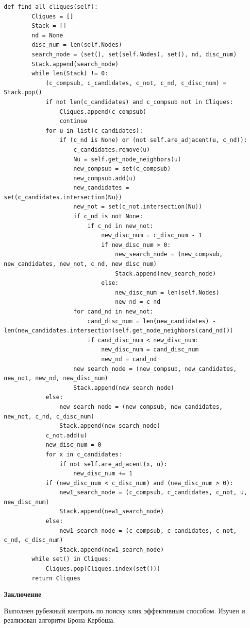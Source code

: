 \documentclass[a4paper,12pt]{report}
\begin{document}
	        \begin{lstlisting}[frame = single, breaklines, caption = Листинг метода поиска всех существующих клик в графе]
	def find_all_cliques(self):
	    Cliques = []
	    Stack = []
	    nd = None
	    disc_num = len(self.Nodes)
	    search_node = (set(), set(self.Nodes), set(), nd, disc_num)
	    Stack.append(search_node)
	    while len(Stack) != 0:
	    	(c_compsub, c_candidates, c_not, c_nd, c_disc_num) = Stack.pop()
	        if not len(c_candidates) and c_compsub not in Cliques:
	        	Cliques.append(c_compsub)
	        	continue
	        for u in list(c_candidates):
	        	if (c_nd is None) or (not self.are_adjacent(u, c_nd)):
	        		c_candidates.remove(u)
	        		Nu = self.get_node_neighbors(u)
	        		new_compsub = set(c_compsub)
	        		new_compsub.add(u)
	        		new_candidates = set(c_candidates.intersection(Nu))
	        		new_not = set(c_not.intersection(Nu))
	        		if c_nd is not None:
	        			if c_nd in new_not:
	        				new_disc_num = c_disc_num - 1
	        				if new_disc_num > 0:
	        					new_search_node = (new_compsub, new_candidates, new_not, c_nd, new_disc_num)
	        					Stack.append(new_search_node)
	        				else:
	        					new_disc_num = len(self.Nodes)
	        					new_nd = c_nd
	        		for cand_nd in new_not:
	        			cand_disc_num = len(new_candidates) - len(new_candidates.intersection(self.get_node_neighbors(cand_nd)))
	        			if cand_disc_num < new_disc_num:
	        				new_disc_num = cand_disc_num
	        				new_nd = cand_nd
	        		new_search_node = (new_compsub, new_candidates, new_not, new_nd, new_disc_num)
	        		Stack.append(new_search_node)
	        else:
	        	new_search_node = (new_compsub, new_candidates, new_not, c_nd, c_disc_num)
	        	Stack.append(new_search_node)
	        c_not.add(u)
	        new_disc_num = 0
	        for x in c_candidates:
	        	if not self.are_adjacent(x, u):
	        		new_disc_num += 1
	        if (new_disc_num < c_disc_num) and (new_disc_num > 0):
	        	new1_search_node = (c_compsub, c_candidates, c_not, u, new_disc_num)
	        	Stack.append(new1_search_node)
	        else:
	        	new1_search_node = (c_compsub, c_candidates, c_not, c_nd, c_disc_num)
	        	Stack.append(new1_search_node)
	    while set() in Cliques:
	    	Cliques.pop(Cliques.index(set()))
	    return Cliques
	        \end{lstlisting} 	

    \newpage

    \begin{center}
        \textbf{Заключение}
    \end{center}
        \label{sec:conclusion_part}
        
   		Выполнен рубежный контроль по поиску клик эффективным способом. 
   		Изучен и реализован алгоритм Брона-Кербоша.
\end{document}

